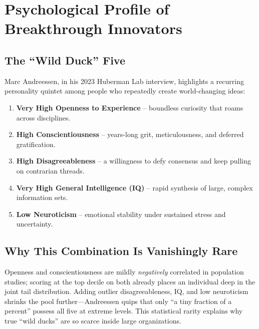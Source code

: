 
\section{Psychological Profile of Breakthrough Innovators}
\label{sec:psychological_profile}

\subsection{The ``Wild Duck'' Five}
Marc Andreessen, in his 2023 Huberman Lab interview, highlights a recurring personality quintet among people who repeatedly create world-changing ideas:

\begin{enumerate}
  \item \textbf{Very High Openness to Experience} -- boundless curiosity that roams across disciplines.
  \item \textbf{High Conscientiousness} -- years-long grit, meticulousness, and deferred gratification.
  \item \textbf{High Disagreeableness} -- a willingness to defy consensus and keep pulling on contrarian threads.
  \item \textbf{Very High General Intelligence (IQ)} -- rapid synthesis of large, complex information sets.
  \item \textbf{Low Neuroticism} -- emotional stability under sustained stress and uncertainty.
\end{enumerate}

\subsection{Why This Combination Is Vanishingly Rare}
Openness and conscientiousness are mildly \emph{negatively} correlated in population studies; scoring at the top decile on both already places an individual deep in the joint tail distribution.
Adding outlier disagreeableness, IQ, and low neuroticism shrinks the pool further---Andreessen quips that only ``a tiny fraction of a percent'' possess all five at extreme levels.
This statistical rarity explains why true ``wild ducks'' are so scarce inside large organizations.

